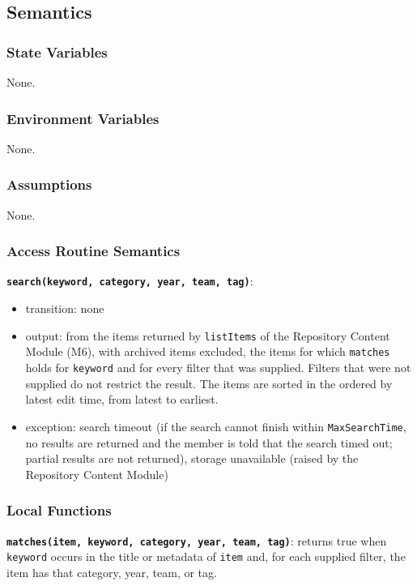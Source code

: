 \documentclass[12pt, titlepage]{article}
\begin{document}
\subsection{Semantics}

\subsubsection{State Variables}
None.

\subsubsection{Environment Variables}
None.

\subsubsection{Assumptions}
None.

\subsubsection{Access Routine Semantics}

\textbf{\texttt{search(keyword, category, year, team, tag)}}:
\begin{itemize}
  \item transition: none
  \item output: from the items returned by \texttt{listItems} of the Repository Content Module (M6), with archived items excluded, the items for which \texttt{matches} holds for \texttt{keyword} and for every filter that was supplied. Filters that were not supplied do not restrict the result. The items are sorted in the ordered by latest edit time, from latest to earliest.
  \item exception: search timeout (if the search cannot finish within \texttt{MaxSearchTime}, no results are returned and the member is told that the search timed out; partial results are not returned), storage unavailable (raised by the Repository Content Module)
\end{itemize}

\subsubsection{Local Functions}
\textbf{\texttt{matches(item, keyword, category, year, team, tag)}}: returns true when \texttt{keyword} occurs in the title or metadata of \texttt{item} and, for each supplied filter, the item has that category, year, team, or tag.
\end{document}
